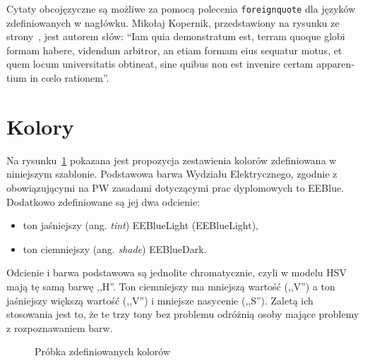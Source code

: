 Cytaty obcojęzyczne są możliwe za pomocą polecenia \texttt{foreignquote} dla języków zdefiniowanych w nagłówku. Mikołaj Kopernik, przedstawiony na rysunku ze strony~\pageref{rys:kopernik}, jest autorem słów: \foreignquote{latin}{Iam quia demonstratum est, terram quoque globi formam habere, videndum arbitror, an etiam formam eius sequatur motus, et quem locum universitatis obtineat, sine quibus non est invenire certam apparentium in cœlo rationem}.

\section{Kolory}
Na rysunku~\ref{rys:colorsample} pokazana jest propozycja zestawienia kolorów zdefiniowana w niniejszym szablonie. Podstawowa barwa Wydziału Elektrycznego, zgodnie z obowiązującymi na PW zasadami dotyczącymi prac dyplomowych to \textcolor{EEBlue}{EEBlue}. Dodatkowo zdefiniowane są jej dwa odcienie:
\begin{itemize}
    \item ton jaśniejszy (ang. \textit{tint}) \textcolor{EEBlueLight}{EEBlueLight} (EEBlueLight),
    \item ton ciemniejszy (ang. \textit{shade}) \textcolor{EEBlueDark}{EEBlueDark}.
\end{itemize}
Odcienie i barwa podstawowa są jednolite chromatycznie, czyli w modelu HSV mają tę samą barwę ,,H''. Ton ciemniejszy ma mniejszą wartość (,,V'') a ton jaśniejszy większą wartość (,,V'') i mniejsze nasycenie (,,S''). Zaletą ich stosowania jest to, że te trzy tony bez problemu odróżnią osoby mające problemy z rozpoznawaniem barw.

\begin{figure}[!ht]
    \centering
    \caption{Próbka zdefiniowanych kolorów}
    \label{rys:colorsample}
\end{figure}

